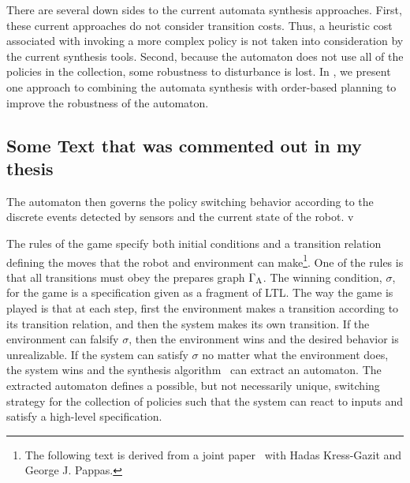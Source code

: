 There are several down sides to the current automata synthesis
approaches.  First, these current approaches do not consider
transition costs.  Thus, a heuristic cost associated with invoking a
more complex policy is not taken into consideration by the current
synthesis tools.  Second, because the automaton does not use all of
the policies in the collection, some robustness to disturbance is
lost.  In , we present one approach to combining the
automata synthesis with order-based planning to improve the robustness
of the automaton.



\subsection{Some Text that was commented out in my thesis}
\label{sec:approach_extra_text}


The automaton then governs the policy switching behavior according to the discrete
events detected by sensors and the current state of the robot. v


 The rules of the game specify both initial conditions and a transition
 relation defining the moves that the robot and environment can
 make\footnote{The following text is derived from a joint
   paper~\cite{dcchkg_07} with Hadas Kress-Gazit and George J.
   Pappas.}.  One of the rules is that all transitions must obey the
 prepares graph $\Gamma_{\Lambda}$.  The winning condition, $\sigma$, for the game
 is a specification given as a fragment of LTL.
 The way the game is played is that at each step, first the environment
 makes a transition according to its transition relation, and then the
 system makes its own transition.  If the environment can falsify
 $\sigma$, then the environment wins and the desired behavior is
 unrealizable.  If the system can satisfy $\sigma$ no matter what the
 environment does, the system wins and the synthesis
 algorithm~\cite{piterman_06} can extract an automaton.  The extracted
 automaton defines a possible, but not necessarily unique, switching
 strategy for the collection of policies such that the system can react
 to inputs and satisfy a high-level specification.

